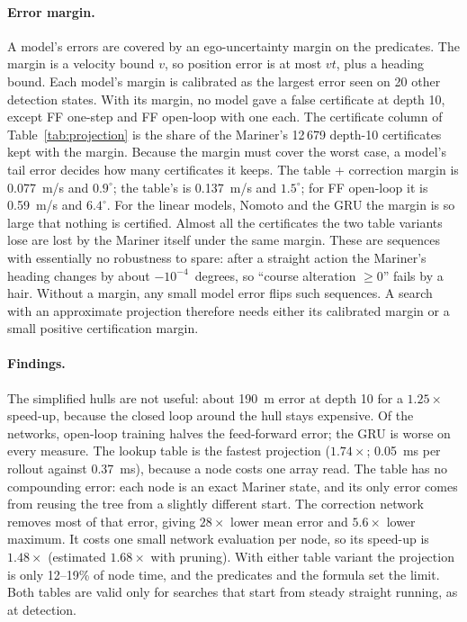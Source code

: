 \documentclass[11pt,a4paper]{article}
\begin{document}
\paragraph{Error margin.} A model's errors are covered by an ego-uncertainty
margin on the predicates. The margin is a velocity bound $v$, so position
error is at most $v t$, plus a heading bound. Each model's margin is calibrated
as the largest error seen on 20 other detection states. With its margin, no
model gave a false certificate at depth 10, except FF one-step and FF
open-loop with one each. The certificate column of Table~\ref{tab:projection}
is the share of the Mariner's 12\,679 depth-10 certificates kept with the
margin. Because the margin must cover the worst case, a model's tail error
decides how many certificates it keeps. The table + correction margin is
0.077~m/s and $0.9^\circ$; the table's is 0.137~m/s and $1.5^\circ$; for FF
open-loop it is 0.59~m/s and $6.4^\circ$. For the linear models, Nomoto and the
GRU the margin is so large that nothing is certified. Almost all the
certificates the two table variants lose are lost by the Mariner itself under
the same margin. These are sequences with essentially no robustness to spare:
after a straight action the Mariner's heading changes by about
$-10^{-4}$~degrees, so ``course alteration $\geq 0$'' fails by a hair.
Without a margin, any small model error flips such sequences. A search with an
approximate projection therefore needs either its calibrated margin or a
small positive certification margin.

\paragraph{Findings.} The simplified hulls are not useful: about 190~m error
at depth 10 for a $1.25\times$ speed-up, because the closed loop around the
hull stays expensive. Of the networks, open-loop training halves the
feed-forward error; the GRU is worse on every measure. The lookup table is
the fastest projection ($1.74\times$; 0.05~ms per rollout against 0.37~ms),
because a node costs one array read. The table has no compounding error: each
node is an exact Mariner state, and its only error comes from reusing the tree
from a slightly different start. The correction network removes most of that
error, giving $28\times$ lower mean error and $5.6\times$ lower maximum. It
costs one small network evaluation per node, so its speed-up is $1.48\times$
(estimated $1.68\times$ with pruning). With either table variant the
projection is only 12--19\% of node time, and the predicates and the formula
set the limit. Both tables are valid only for searches that start from steady
straight running, as at detection.
\end{document}
